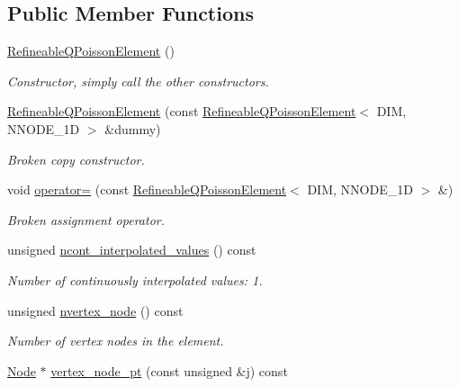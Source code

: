 \subsection*{Public Member Functions}
\begin{DoxyCompactItemize}
\item 
\hyperlink{classoomph_1_1RefineableQPoissonElement_a8a58299ad4e7accd4d35defd255ff17d}{Refineable\+Q\+Poisson\+Element} ()
\begin{DoxyCompactList}\small\item\em Constructor, simply call the other constructors. \end{DoxyCompactList}\item 
\hyperlink{classoomph_1_1RefineableQPoissonElement_aa2d538a46ca8aeb5eba0cb190ff6bbdf}{Refineable\+Q\+Poisson\+Element} (const \hyperlink{classoomph_1_1RefineableQPoissonElement}{Refineable\+Q\+Poisson\+Element}$<$ D\+IM, N\+N\+O\+D\+E\+\_\+1D $>$ \&dummy)
\begin{DoxyCompactList}\small\item\em Broken copy constructor. \end{DoxyCompactList}\item 
void \hyperlink{classoomph_1_1RefineableQPoissonElement_a34c50854e8a2f3b198c399375d410f80}{operator=} (const \hyperlink{classoomph_1_1RefineableQPoissonElement}{Refineable\+Q\+Poisson\+Element}$<$ D\+IM, N\+N\+O\+D\+E\+\_\+1D $>$ \&)
\begin{DoxyCompactList}\small\item\em Broken assignment operator. \end{DoxyCompactList}\item 
unsigned \hyperlink{classoomph_1_1RefineableQPoissonElement_a71e7df11399a174eab51b156da4948b9}{ncont\+\_\+interpolated\+\_\+values} () const
\begin{DoxyCompactList}\small\item\em Number of continuously interpolated values\+: 1. \end{DoxyCompactList}\item 
unsigned \hyperlink{classoomph_1_1RefineableQPoissonElement_aa0459e0394b99cdba6b70780dc33688e}{nvertex\+\_\+node} () const
\begin{DoxyCompactList}\small\item\em Number of vertex nodes in the element. \end{DoxyCompactList}\item 
\hyperlink{classoomph_1_1Node}{Node} $\ast$ \hyperlink{classoomph_1_1RefineableQPoissonElement_a59c7b6a6abd015316b87672dae4ec85f}{vertex\+\_\+node\+\_\+pt} (const unsigned \&j) const

\end{DoxyCompactItemize}
